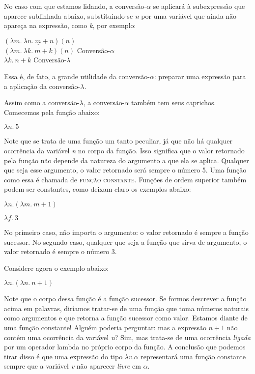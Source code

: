 \n No caso com que estamos lidando, a conversão-$\alpha$ se
aplicará à subexpressão que aparece sublinhada abaixo,
substituindo-se \textit{n} por uma variável que ainda não apareça
na expressão, como \textit{k}, por
exemplo:

\begin{exe}
	\ex $(\lambda m.\ \underline{\lambda n.\ m+n})(n)$\\
	$(\lambda m.\ \lambda k.\ m+k)(n)$ \hfill
	Conversão-$\alpha$\\
	$\lambda k.\ n+k$ \hfill Conversão-$\lambda$
\end{exe}

\n Essa é, de fato, a grande utilidade da conversão-$\alpha$:
preparar uma expressão para a aplicação da conversão-$\lambda$.

Assim como a conversão-$\lambda$, a conversão-$\alpha$ também tem seus caprichos. Comecemos pela função abaixo:

\begin{exe}
	\ex $\lambda n.\ 5$
\end{exe}

\n Note que se trata de uma função um tanto peculiar, já que não
há qualquer ocorrência da variável \textit{n} no corpo da
função. Isso significa que o valor retornado pela função não
depende da natureza do argumento a que ela se aplica. Qualquer que
seja esse argumento, o valor retornado será sempre o número 5. Uma
função como essa é chamada de \textsc{função constante}.
Funções de ordem superior também podem ser constantes, como
deixam claro os
exemplos abaixo:

\begin{exe}
	\ex $\lambda n.(\lambda m.\ m+1)$
\end{exe}

\begin{exe}
	\ex $\lambda f.\ 3$
\end{exe}

\n No primeiro caso, não importa o argumento: o valor retornado é
sempre a função sucessor. No segundo caso, qualquer que seja a
função que sirva de argumento, o valor retornado é sempre o
número 3.

Considere agora o exemplo abaixo:

\begin{exe}
	\ex $\lambda n.(\lambda n.\ n+1)$
\end{exe}


\n Note que o corpo dessa função é a função sucessor. Se
formos descrever a função acima em palavras, diríamos tratar-se
de uma função que toma números naturais como argumentos e que
retorna a função sucessor como valor. Estamos diante de uma
função constante! Alguém poderia perguntar: mas a expressão
$n+1$ não contém uma ocorrência da variável \textit{n}? Sim,
mas trata-se de uma ocorrência \textit{ligada} por um
operador lambda no próprio corpo da função. A conclusão que
podemos tirar disso é que uma expressão do tipo $\lambda v.
\alpha$ representará uma função constante sempre que a variável
\textit{v} não aparecer \textit{livre} em $\alpha$.

